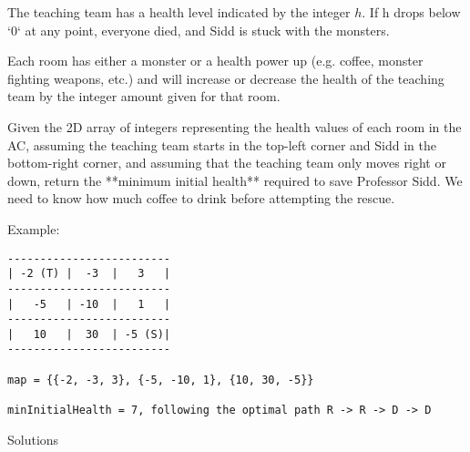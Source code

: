 \documentclass{article}
\begin{document}
\begin{enumerate}
The teaching team has a health level indicated by the integer $h$.  If h drops below `0` at any point, everyone died, and Sidd is stuck with the monsters.

Each room has either a monster or a health power up (e.g. coffee, monster fighting weapons, etc.) and will increase or decrease the health of the teaching team by the integer amount given for that room.

Given the 2D array of integers representing the health values of each room in the AC, assuming the teaching team starts in the top-left corner and Sidd in the bottom-right corner, and assuming that the teaching team only moves right or down, return the **minimum initial health** required to save Professor Sidd.  We need to know how much coffee to drink before attempting the rescue.

Example:

\begin{lstlisting}
-------------------------
| -2 (T) |  -3	|   3   |
-------------------------
|   -5   | -10  |   1   |
-------------------------
|   10   |  30  | -5 (S)|
-------------------------

map = {{-2, -3, 3}, {-5, -10, 1}, {10, 30, -5}}

minInitialHealth = 7, following the optimal path R -> R -> D -> D
\end{lstlisting}

\end{enumerate}

\newpage

\begin{center}
Solutions
\end{center}
\end{document}
